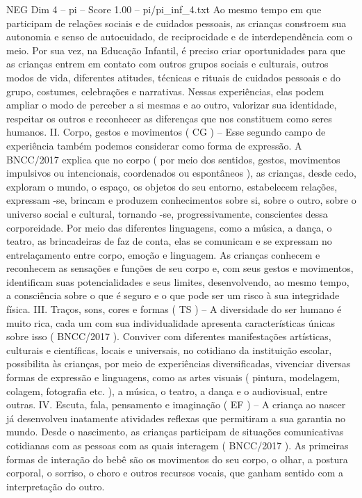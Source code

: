 \begin{textsample}{NEG Dim 4 – pi – Score 1.00 – pi/pi\_inf\_4.txt}
Ao mesmo tempo em que participam de relações sociais e de cuidados pessoais, as crianças constroem sua autonomia e senso de autocuidado, de reciprocidade e de interdependência com o meio.
Por sua vez, na Educação Infantil, é preciso criar oportunidades para que as crianças entrem em contato com outros grupos sociais e culturais, outros modos de vida, diferentes atitudes, técnicas e rituais de cuidados pessoais e do grupo, costumes, celebrações e narrativas.
Nessas experiências, elas podem ampliar o modo de perceber a si mesmas e ao outro, valorizar sua identidade, respeitar os outros e reconhecer as diferenças que nos constituem como seres humanos.
II.
Corpo, gestos e movimentos ( CG ) – Esse segundo campo de experiência também podemos considerar como forma de expressão.
A BNCC/2017 explica que no corpo ( por meio dos sentidos, gestos, movimentos impulsivos ou intencionais, coordenados ou espontâneos ), as crianças, desde cedo, exploram o mundo, o espaço, os objetos do seu entorno, estabelecem relações, expressam -se, brincam e produzem conhecimentos sobre si, sobre o outro, sobre o universo social e cultural, tornando -se, progressivamente, conscientes dessa corporeidade.
Por meio das diferentes linguagens, como a música, a dança, o teatro, as brincadeiras de faz de conta, elas se comunicam e se expressam no entrelaçamento entre corpo, emoção e linguagem.
As crianças conhecem e reconhecem as sensações e funções de seu corpo e, com seus gestos e movimentos, identificam suas potencialidades e seus limites, desenvolvendo, ao mesmo tempo, a consciência sobre o que é seguro e o que pode ser um risco à sua integridade física.
III.
Traços, sons, cores e formas ( TS ) – A diversidade do ser humano é muito rica, cada um com sua individualidade apresenta características únicas sobre isso ( BNCC/2017 ).
Conviver com diferentes manifestações artísticas, culturais e científicas, locais e universais, no cotidiano da instituição escolar, possibilita às crianças, por meio de experiências diversificadas, vivenciar diversas formas de expressão e linguagens, como as artes visuais ( pintura, modelagem, colagem, fotografia etc. ), a música, o teatro, a dança e o audiovisual, entre outras.
IV.
Escuta, fala, pensamento e imaginação ( EF ) – A criança ao nascer já desenvolveu inatamente atividades reflexas que permitiram a sua garantia no mundo.
Desde o nascimento, as crianças participam de situações comunicativas cotidianas com as pessoas com as quais interagem ( BNCC/2017 ).
As primeiras formas de interação do bebê são os movimentos do seu corpo, o olhar, a postura corporal, o sorriso, o choro e outros recursos vocais, que ganham sentido com a interpretação do outro.

\end{textsample}
